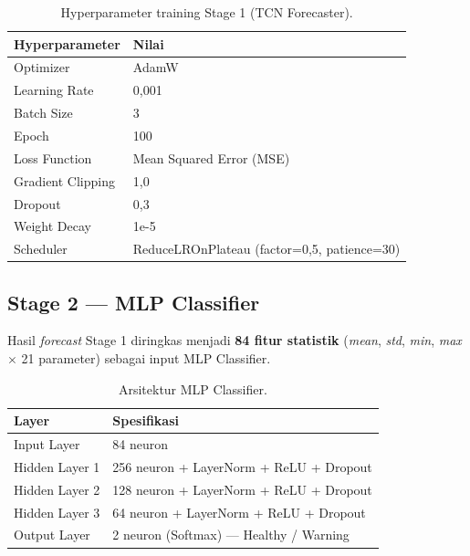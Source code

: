 \documentclass[12pt,a4paper]{report}
\begin{document}
\begin{table}[H]
    \centering
    \caption{Hyperparameter training Stage 1 (TCN Forecaster).}
    \begin{tabular}{ll}
        \toprule
        \textbf{Hyperparameter} & \textbf{Nilai} \\
        \midrule
        Optimizer & AdamW \\
        Learning Rate & 0,001 \\
        Batch Size & 3 \\
        Epoch & 100 \\
        Loss Function & Mean Squared Error (MSE) \\
        Gradient Clipping & 1,0 \\
        Dropout & 0,3 \\
        Weight Decay & 1e-5 \\
        Scheduler & ReduceLROnPlateau (factor=0,5, patience=30) \\
        \bottomrule
    \end{tabular}
\end{table}

\subsection{Stage 2 — MLP Classifier}
Hasil \textit{forecast} Stage 1 diringkas menjadi \textbf{84 fitur statistik} (\textit{mean}, \textit{std}, \textit{min}, \textit{max} $\times$ 21 parameter) sebagai input MLP Classifier.

\begin{table}[H]
    \centering
    \caption{Arsitektur MLP Classifier.}
    \begin{tabular}{ll}
        \toprule
        \textbf{Layer} & \textbf{Spesifikasi} \\
        \midrule
        Input Layer   & 84 neuron \\
        Hidden Layer 1 & 256 neuron + LayerNorm + ReLU + Dropout \\
        Hidden Layer 2 & 128 neuron + LayerNorm + ReLU + Dropout \\
        Hidden Layer 3 & 64 neuron + LayerNorm + ReLU + Dropout \\
        Output Layer  & 2 neuron (Softmax) — Healthy / Warning \\
        \bottomrule
    \end{tabular}
\end{table}
\end{document}
